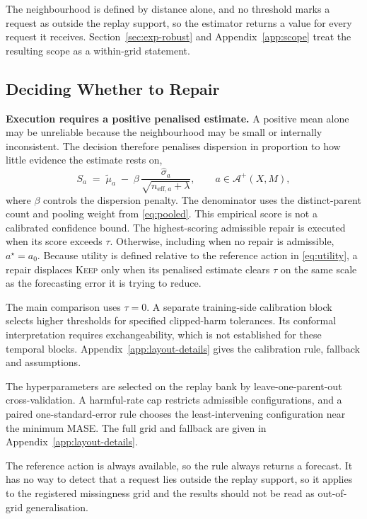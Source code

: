 \documentclass{article}
\newcommand{\calA}{\mathcal{A}}
\begin{document}
The neighbourhood is defined by distance alone, and no threshold marks a request as outside the
replay support, so the estimator returns a value for every request it receives.
Section~\ref{sec:exp-robust} and Appendix~\ref{app:scope} treat the resulting scope as a
within-grid statement.

\subsection{Deciding Whether to Repair}
\label{sec:method-decision}
\textbf{Execution requires a positive penalised estimate.} A positive mean alone may be unreliable because the
neighbourhood may be small or internally inconsistent. The decision therefore penalises
dispersion in proportion to how little evidence the estimate rests on,
\begin{equation}
  S_a \;=\; \tilde\mu_a \;-\; \beta\, \frac{\hat\sigma_a}{\sqrt{n_{\mathrm{eff},a} + \lambda}},
  \qquad a \in \calA^{+}(X,M),
  \label{eq:score}
\end{equation}
where $\beta$ controls the dispersion penalty. The denominator uses the distinct-parent
count and pooling weight from \eqref{eq:pooled}. This empirical score is not a calibrated
confidence bound. The highest-scoring admissible repair is executed when its score exceeds
$\tau$. Otherwise, including when no repair is admissible, $a^{\star}=a_0$. Because utility is
defined relative to the reference action in \eqref{eq:utility}, a repair displaces
\textsc{Keep} only when its penalised estimate clears $\tau$ on the same scale as the
forecasting error it is trying to reduce.

The main comparison uses $\tau=0$. A separate training-side calibration block selects
higher thresholds for specified clipped-harm tolerances. Its conformal interpretation
requires exchangeability, which is not established for these temporal blocks.
Appendix~\ref{app:layout-details} gives the calibration rule, fallback and assumptions.

The hyperparameters are selected on the replay bank by leave-one-parent-out cross-validation.
A harmful-rate cap restricts admissible configurations, and a paired one-standard-error rule
chooses the least-intervening configuration near the minimum MASE. The full grid and fallback
are given in Appendix~\ref{app:layout-details}.

The reference action is always available, so the rule always returns a forecast. It has no way
to detect that a request lies outside the replay support, so it applies to the registered
missingness grid and the results should not be read as out-of-grid generalisation.
\end{document}
